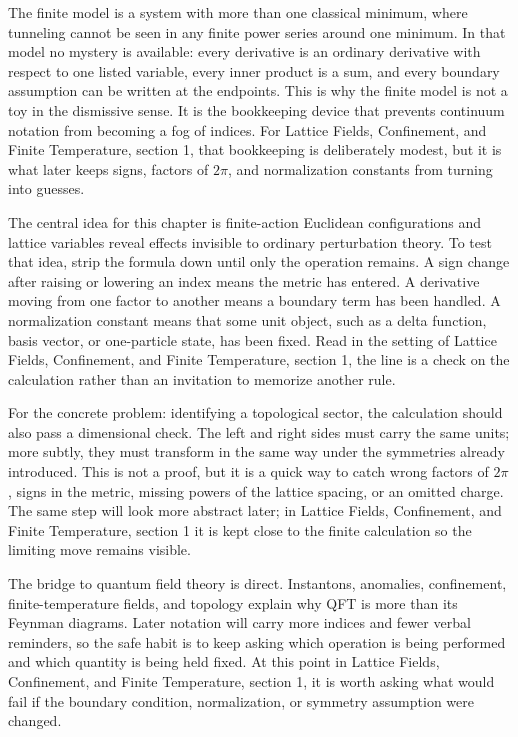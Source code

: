 The finite model is a system with more than one classical minimum, where tunneling cannot be seen in any finite power series around one minimum.  In that model no mystery is available: every derivative is an ordinary derivative with respect to one listed variable, every inner product is a sum, and every boundary assumption can be written at the endpoints.  This is why the finite model is not a toy in the dismissive sense.  It is the bookkeeping device that prevents continuum notation from becoming a fog of indices.  For Lattice Fields, Confinement, and Finite Temperature, section 1, that bookkeeping is deliberately modest, but it is what later keeps signs, factors of \(2\pi\), and normalization constants from turning into guesses.

The central idea for this chapter is finite-action Euclidean configurations and lattice variables reveal effects invisible to ordinary perturbation theory.  To test that idea, strip the formula down until only the operation remains.  A sign change after raising or lowering an index means the metric has entered.  A derivative moving from one factor to another means a boundary term has been handled.  A normalization constant means that some unit object, such as a delta function, basis vector, or one-particle state, has been fixed.  Read in the setting of Lattice Fields, Confinement, and Finite Temperature, section 1, the line is a check on the calculation rather than an invitation to memorize another rule.

For the concrete problem: identifying a topological sector, the calculation should also pass a dimensional check.  The left and right sides must carry the same units; more subtly, they must transform in the same way under the symmetries already introduced.  This is not a proof, but it is a quick way to catch wrong factors of \(2\pi\), signs in the metric, missing powers of the lattice spacing, or an omitted charge.  The same step will look more abstract later; in Lattice Fields, Confinement, and Finite Temperature, section 1 it is kept close to the finite calculation so the limiting move remains visible.

The bridge to quantum field theory is direct.  Instantons, anomalies, confinement, finite-temperature fields, and topology explain why QFT is more than its Feynman diagrams.  Later notation will carry more indices and fewer verbal reminders, so the safe habit is to keep asking which operation is being performed and which quantity is being held fixed.  At this point in Lattice Fields, Confinement, and Finite Temperature, section 1, it is worth asking what would fail if the boundary condition, normalization, or symmetry assumption were changed.

